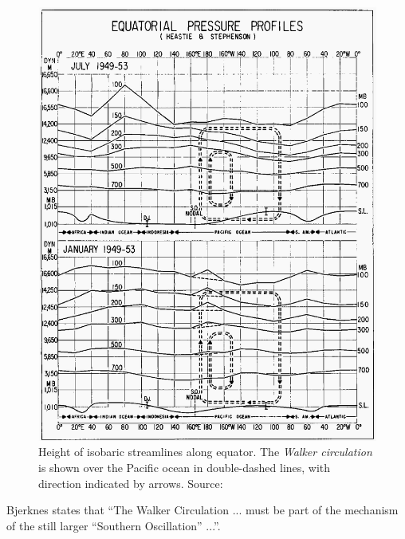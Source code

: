\begin{figure}[t]
  \centering
  \includegraphics[width=0.9\linewidth]{figures/equatorial-pressure-profiles.png}
  \caption{Height of isobaric streamlines along equator. The \emph{Walker
      circulation} is shown over the Pacific ocean in double-dashed lines, with
    direction indicated by arrows. Source: \citet{bjerknes1969}}
  \label{fig:pressureprofiles}
\end{figure}

Bjerknes states that ``The Walker Circulation ... must be part of the mechanism
of the still larger ``Southern Oscillation'' ...''.



